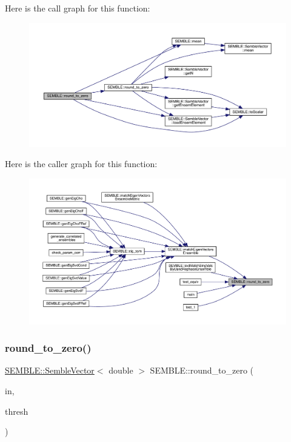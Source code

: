 Here is the call graph for this function\+:
\nopagebreak
\begin{figure}[H]
\begin{center}
\leavevmode
\includegraphics[width=350pt]{d7/dfd/namespaceSEMBLE_a29461d5fa5230523d54ef8f4a974904b_cgraph}
\end{center}
\end{figure}
Here is the caller graph for this function\+:
\nopagebreak
\begin{figure}[H]
\begin{center}
\leavevmode
\includegraphics[width=350pt]{d7/dfd/namespaceSEMBLE_a29461d5fa5230523d54ef8f4a974904b_icgraph}
\end{center}
\end{figure}
\mbox{\label{namespaceSEMBLE_a0b915e7bcb9aa26f8723de8b033da4e0}} 
\subsubsection{\texorpdfstring{round\_to\_zero()}{round\_to\_zero()}\hspace{0.1cm}{\footnotesize\ttfamily [2/2]}}
{\footnotesize\ttfamily \mbox{\hyperlink{structSEMBLE_1_1SembleVector}{S\+E\+M\+B\+L\+E\+::\+Semble\+Vector}}$<$ double $>$ S\+E\+M\+B\+L\+E\+::round\+\_\+to\+\_\+zero (\begin{DoxyParamCaption}\item[{const \mbox{\hyperlink{structSEMBLE_1_1SembleVector}{S\+E\+M\+B\+L\+E\+::\+Semble\+Vector}}$<$ double $>$ \&}]{in,  }\item[{const double}]{thresh }\end{DoxyParamCaption})}

